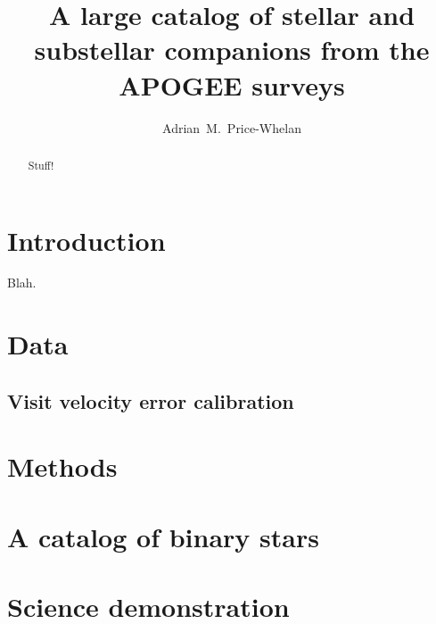 \documentclass[modern]{aastex62}
\begin{document}
\title{A large catalog of stellar and substellar companions from the APOGEE surveys}

\author[0000-0003-0872-7098]{Adrian~M.~Price-Whelan}


\begin{abstract}
Stuff!
\end{abstract}

\keywords{}


\section{Introduction} \label{sec:intro}

Blah.


\section{Data} \label{sec:data}

\subsection{Visit velocity error calibration} \label{sec:visitcalib}


\section{Methods} \label{sec:methods}



\section{A catalog of binary stars} \label{sec:catalog}


\section{Science demonstration} \label{sec:science}
\end{document}

